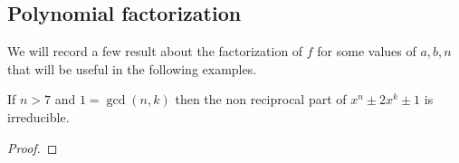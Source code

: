 \documentclass[../main.tex]{subfiles}
\begin{document}
\subsection{Polynomial factorization}
We will record a few result about the factorization of $f$ for some values of $a,b,n$ that will be useful in the following examples.
\begin{lemma}
  \label{lem:filaseta_et_al}
  If $n > 7$ and $1 = \gcd\left( n,k \right)$ then the non reciprocal part of $x^n \pm 2x^k \pm 1$ is irreducible.
\end{lemma}
\begin{proof}
\end{proof}
  
\end{document}
